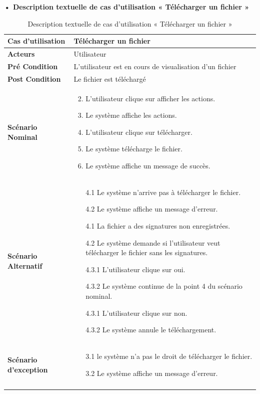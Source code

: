 \textbf{•	Description textuelle de cas d'utilisation « Télécharger un fichier »}
\begin{longtable}{|p{5cm}|p{10cm}|}
\hline
\textbf{Cas d'utilisation}&Télécharger un fichier\\
\hline
\textbf{Acteurs}&Utilisateur\\
\hline
\textbf{Pré Condition}&L'utilisateur est en cours de visualisation d'un fichier\\
\hline
\textbf{Post Condition}&Le fichier est téléchargé\\
\hline
\textbf{Scénario Nominal}&
\vspace{-\baselineskip}
\begin{enumerate}
    \setcounter{enumi}{1}
  \item L'utilisateur clique sur afficher les actions.
  \item Le système affiche les actions.
  \item L'utilisateur clique sur télécharger.
  \item Le système télécharge le fichier.
  \item Le système affiche un message de succès.
\end{enumerate}\\
\hline
\textbf{Scénario Alternatif}&
\vspace{-\baselineskip}
\begin{enumerate}
  \item [4.1] Le système n'arrive pas à télécharger le fichier.
  \item [4.2] Le système affiche un message d'erreur.
  \item [4.1] La fichier a des signatures non enregistrées.
  \item [4.2] Le système demande si l'utilisateur veut télécharger le fichier sans les signatures.
  \item [4.3.1] L'utilisateur clique sur oui.
  \item [4.3.2] Le système continue de la point 4 du scénario nominal.
  \item [4.3.1] L'utilisateur clique sur non.
  \item [4.3.2] Le système annule le téléchargement.

\end{enumerate}\\
\hline
\textbf{Scénario d'exception}&
\vspace{-\baselineskip}
\begin{enumerate}
  \item [3.1] le système n'a pas le droit de télécharger le fichier.
  \item [3.2] Le système affiche un message d'erreur.
\end{enumerate}\\
\hline
\caption{Description textuelle de cas d'utilisation « Télécharger un fichier »}
\label{tab:description-textuelle-de-cas-d-utilisation-telecharger-un-fichier}
\end{longtable}


